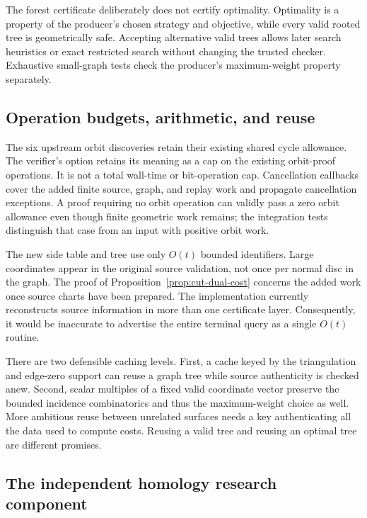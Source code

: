 The forest certificate deliberately does not certify optimality. Optimality
is a property of the producer's chosen strategy and objective, while every
valid rooted tree is geometrically safe. Accepting alternative valid trees
allows later search heuristics or exact restricted search without changing
the trusted checker. Exhaustive small-graph tests check the producer's
maximum-weight property separately.

\subsection{Operation budgets, arithmetic, and reuse}

The six upstream orbit discoveries retain their existing shared cycle
allowance. The verifier's  option retains its meaning
as a cap on the existing orbit-proof operations. It is not a total wall-time
or bit-operation cap. Cancellation callbacks cover the added finite source,
graph, and replay work and propagate cancellation exceptions. A proof
requiring no orbit operation can validly pass a zero orbit allowance even
though finite geometric work remains; the integration tests distinguish
that case from an input with positive orbit work.

The new side table and tree use only $O(t)$ bounded identifiers. Large
coordinates appear in the original source validation, not once per normal
disc in the graph. The proof of Proposition~\ref{prop:cut-dual-cost} concerns
the added work once source charts have been prepared. The implementation
currently reconstructs source information in more than one certificate
layer. Consequently, it would be inaccurate to advertise the entire
terminal query as a single $O(t)$ routine.

There are two defensible caching levels. First, a cache keyed by the
triangulation and edge-zero support can reuse a graph tree while source
authenticity is checked anew. Second, scalar multiples of a fixed valid
coordinate vector preserve the bounded incidence combinatorics and thus
the maximum-weight choice as well. More ambitious reuse between unrelated
surfaces needs a key authenticating all the data used to compute costs.
Reusing a valid tree and reusing an optimal tree are different promises.

\subsection{The independent homology research component}


